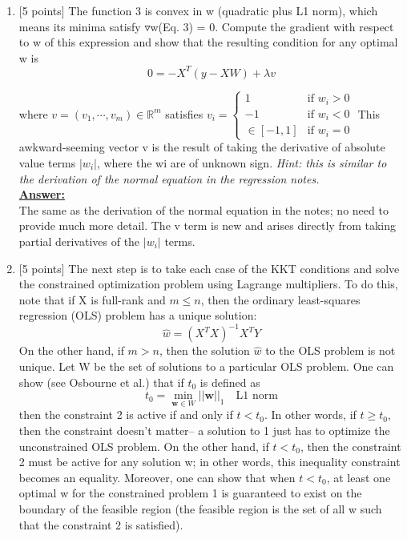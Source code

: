 \documentclass{article}
\renewcommand{\vec}[1]{\boldsymbol{#1}}
\newenvironment{qparts}{\begin{enumerate}[1.]}{\end{enumerate}}
\begin{document}
\begin{qparts}
\item {[}5 points{]}
The function 3 is convex in w (quadratic plus L1 norm), which means its minima satisfy
$\triangledown$w(Eq. 3) = 0. Compute the gradient with respect to w of this expression and show that the resulting condition for any optimal w is
\begin{equation}
0=-X^T(y-XW)+\lambda v
\end{equation}

where $v=(v_1,\cdots, v_m)\in\mathbb{R}^m$ satisfies $v_i=\begin{cases}
1 & \text{if $w_i>0$} \\
-1 & \text{if $w_i<0$} \\
\in[-1,1] &\text{if $w_i=0$} 
\end{cases}$
This awkward-seeming vector v is the result of taking the derivative of absolute value terms $|w_i|$, where the wi are of unknown sign. \textit{Hint: this is similar to the derivation of the normal equation in the regression notes.}\\
\underline{\textbf{Answer:}}\\
{\color{blue}
The same as the derivation of the normal equation in the notes; no need to provide
much more detail. The v term is new and arises directly from taking partial derivatives of the $|w_i|$ terms.}

\item {[}5 points{]}
The next step is to take each case of the KKT conditions and solve the constrained optimization problem using Lagrange multipliers. To do this, note that if X is full-rank and $m \leq n$, then the ordinary least-squares regression (OLS) problem has a unique solution:
\begin{equation}
\hat{w}=(X^TX)^{-1}X^TY
\end{equation}
On the other hand, if $m > n$, then the solution $\hat{w}$ to the OLS problem is not unique. Let W be the set of solutions to a particular OLS problem. One can show (see Osbourne et al.) that if $t_0$ is defined as
\begin{equation}
t_0=\min_{\vec{w}\in W}||\vec{w}||_1\quad\text{L1 norm}
\end{equation}
then the constraint 2 is active if and only if $t < t_0$. In other words, if $t \geq t_0$, then the constraint doesn’t matter– a solution to 1 just has to optimize the unconstrained OLS problem. On the other hand, if $t < t_0$, then the constraint 2 must be active for any solution w; in other words, this inequality constraint becomes an equality. Moreover, one can show that when $t < t_0$, at least one optimal w for
the constrained problem 1 is guaranteed to exist on the boundary of the feasible region (the feasible region is the set of all w such that the constraint 2 is satisfied).


\end{qparts}
\end{document}
